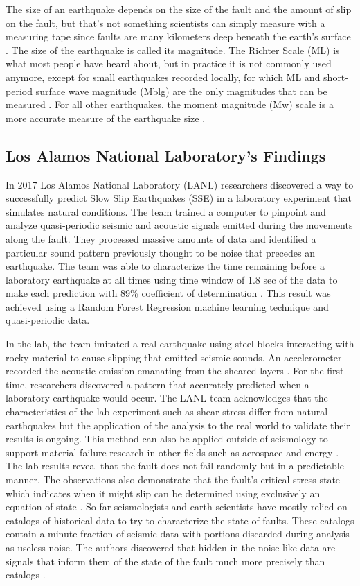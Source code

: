 \documentclass[]{llncs} %
\begin{document}
The size of an earthquake depends on the size of the fault and the amount of slip on the fault, but that’s not something scientists can simply measure with a measuring tape since faults are many kilometers deep beneath the earth’s surface \cite{Wald}. The size of the earthquake is called its magnitude. The Richter Scale (ML) is what most people have heard about, but in practice it is not commonly used anymore, except for small earthquakes recorded locally, for which ML and short-period surface wave magnitude (Mblg) are the only magnitudes that can be measured \cite{Hayes}. For all other earthquakes, the moment magnitude (Mw) scale is a more accurate measure of the earthquake size \cite{Hayes}.


\subsection{Los Alamos National Laboratory's Findings}
In 2017 Los Alamos National Laboratory (LANL) researchers discovered a way to successfully predict Slow Slip Earthquakes (SSE) in a laboratory experiment that simulates natural conditions. The team trained a computer to pinpoint and analyze quasi‐periodic seismic and acoustic signals emitted during the movements along the fault. They processed massive amounts of data and identified a particular sound pattern previously thought to be noise that precedes an earthquake. The team was able to characterize the time remaining before a laboratory earthquake at all times using time window of 1.8 sec of the data to make each prediction with 89\% coefficient of determination \cite{LANLNews}. This result was achieved using a Random Forest Regression machine learning technique and quasi‐periodic data. \par

In the lab, the team imitated a real earthquake using steel blocks interacting with rocky material to cause slipping that emitted seismic sounds. An accelerometer recorded the acoustic emission emanating from the sheared layers \cite{LANLNews}. For the first time, researchers discovered a pattern that accurately predicted when a laboratory earthquake would occur. The LANL team acknowledges that the characteristics of the lab experiment such as shear stress differ from natural earthquakes but the application of the analysis to the real world to validate their results is ongoing. This method can also be applied outside of seismology to support material failure research in other fields such as aerospace and energy \cite{LANLNews}. The lab results reveal that the fault does not fail randomly but in a predictable manner. The observations also demonstrate that the fault’s critical stress state which indicates when it might slip can be determined using exclusively an equation of state \cite{LANLNews}. So far seismologists and earth scientists have mostly relied on catalogs of historical data to try to characterize the state of faults. These catalogs contain a minute fraction of seismic data with portions discarded during analysis as useless noise. The authors discovered that hidden in the noise-like data are signals that inform them of the state of the fault much more precisely than catalogs \cite{LANLNews}. \par
\end{document}
